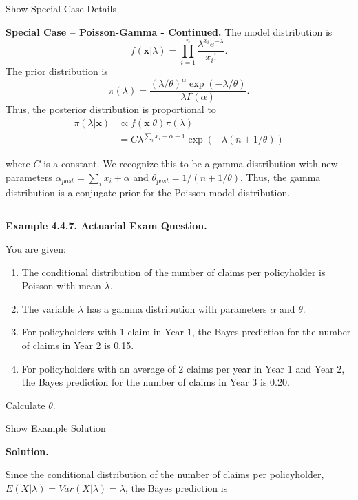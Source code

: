 \documentclass[]{book}
\providecommand{\tightlist}{%
  \setlength{\itemsep}{0pt}\setlength{\parskip}{0pt}}
\theoremstyle{definition}
\theoremstyle{definition}
\theoremstyle{definition}
\theoremstyle{remark}
\begin{document}
Show Special Case Details

\hypertarget{toggleExampleConj}{}
\textbf{Special Case -- Poisson-Gamma - Continued.} The model
distribution is
\[f(\mathbf{x} | \lambda) = \prod_{i=1}^n \frac{\lambda^{x_i} e^{-\lambda}}{x_i!} .\]
The prior distribution is
\[\pi(\lambda) = \frac{\left(\lambda/\theta\right)^{\alpha} \exp(-\lambda/\theta)}{\lambda \Gamma(\alpha)}.\]
Thus, the posterior distribution is proportional to \[
\begin{aligned}
\pi(\lambda | \mathbf{x}) &\propto f(\mathbf{x}|\theta ) \pi(\lambda) \\
&= C \lambda^{\sum_i x_i + \alpha -1} \exp(-\lambda(n+1/\theta))
\end{aligned}
\]

where \(C\) is a constant. We recognize this to be a gamma distribution
with new parameters \(\alpha_{post} = \sum_i x_i + \alpha\) and
\(\theta_{post} = 1/(n + 1/\theta)\). Thus, the gamma distribution is a
conjugate prior for the Poisson model distribution.

\begin{center}\rule{0.5\linewidth}{\linethickness}\end{center}

\textbf{Example 4.4.7. Actuarial Exam Question.}

You are given:

\begin{enumerate}
\def\labelenumi{(\roman{enumi})}
\tightlist
\item
  The conditional distribution of the number of claims per policyholder
  is Poisson with mean \(\lambda\).
\item
  The variable \(\lambda\) has a gamma distribution with parameters
  \(\alpha\) and \(\theta\).
\item
  For policyholders with 1 claim in Year 1, the Bayes prediction for the
  number of claims in Year 2 is 0.15.
\item
  For policyholders with an average of 2 claims per year in Year 1 and
  Year 2, the Bayes prediction for the number of claims in Year 3 is
  0.20.
\end{enumerate}

Calculate \(\theta\).

Show Example Solution

\hypertarget{toggleExampleSelect.4.7}{}
\textbf{Solution.}

Since the conditional distribution of the number of claims per
policyholder, \(E(X|\lambda)=Var(X|\lambda)=\lambda\), the Bayes
prediction is
\end{document}
